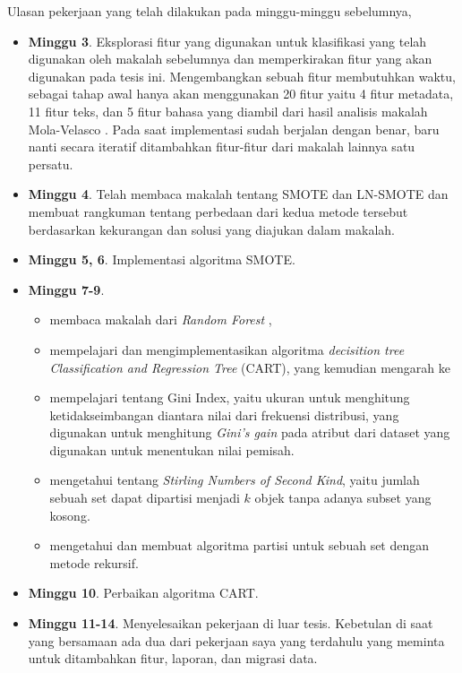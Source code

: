Ulasan pekerjaan yang telah dilakukan pada minggu-minggu sebelumnya,

\begin{itemize}

\item \textbf{Minggu 3}. Eksplorasi fitur yang digunakan untuk klasifikasi
yang telah digunakan oleh makalah sebelumnya dan memperkirakan fitur yang akan
digunakan pada tesis ini.
Mengembangkan sebuah fitur membutuhkan waktu, sebagai tahap awal hanya akan
menggunakan 20 fitur yaitu 4 fitur metadata, 11 fitur teks, dan 5 fitur bahasa
yang diambil dari hasil analisis makalah Mola-Velasco \cite{mola2012wikipedia}.
Pada saat implementasi sudah berjalan dengan benar, baru nanti secara iteratif
ditambahkan fitur-fitur dari makalah lainnya satu persatu.

\item \textbf{Minggu 4}.
Telah membaca makalah tentang SMOTE \cite{chawla2002smote} dan LN-SMOTE
\cite{maciejewski2011local} dan membuat rangkuman tentang perbedaan dari kedua
metode tersebut berdasarkan kekurangan dan solusi yang diajukan dalam makalah.

\item \textbf{Minggu 5, 6}. Implementasi algoritma SMOTE.

\item \textbf{Minggu 7-9}.
	\begin{itemize}
	\item membaca makalah dari \textit{Random Forest} \cite{breiman2001random},
	\item mempelajari dan mengimplementasikan algoritma \textit{decisition
	tree} \textit{Classification and Regression Tree} (CART), yang kemudian
	mengarah ke
	\item mempelajari tentang Gini Index, yaitu ukuran untuk menghitung
	ketidakseimbangan diantara nilai dari frekuensi distribusi, yang
	digunakan untuk menghitung \textit{Gini's gain} pada atribut dari
	dataset yang digunakan untuk menentukan nilai pemisah.
	\item mengetahui tentang \textit{Stirling Numbers of Second Kind},
	yaitu jumlah sebuah set dapat dipartisi menjadi $ k $ objek tanpa
	adanya subset yang kosong.
	\item mengetahui dan membuat algoritma partisi untuk sebuah set dengan
	metode rekursif.
	\end{itemize}

\item \textbf{Minggu 10}.  Perbaikan algoritma CART.

\item \textbf{Minggu 11-14}. Menyelesaikan pekerjaan di luar tesis.
Kebetulan di saat yang bersamaan ada dua dari pekerjaan saya yang terdahulu
yang meminta untuk ditambahkan fitur, laporan, dan migrasi data.

\end{itemize}
